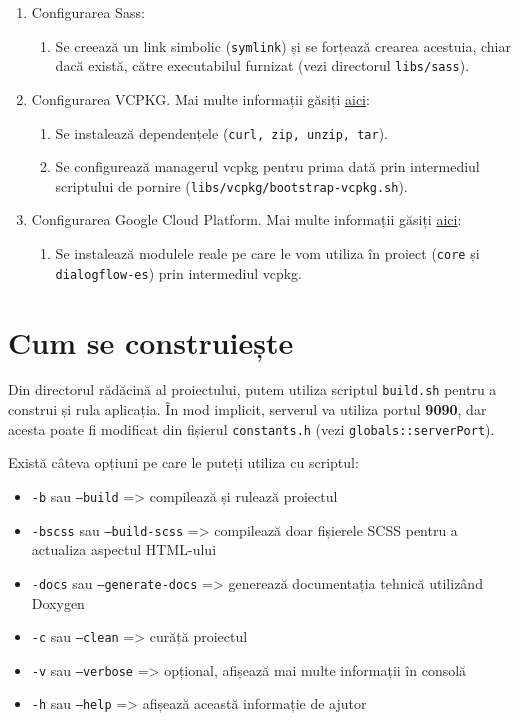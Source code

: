 \begin{enumerate}
  \item Configurarea Sass:
    \begin{enumerate}
      \item Se creează un link simbolic (\texttt{symlink}) și se forțează crearea acestuia, chiar dacă există, către executabilul furnizat (vezi directorul \texttt{libs/sass}).
    \end{enumerate}
  \item Configurarea VCPKG. Mai multe informații găsiți \href{https://github.com/Microsoft/vcpkg}{aici}:
    \begin{enumerate}
      \item Se instalează dependențele (\texttt{curl, zip, unzip, tar}).
      \item Se configurează managerul vcpkg pentru prima dată prin intermediul scriptului de pornire (\texttt{libs/vcpkg/bootstrap-vcpkg.sh}).
    \end{enumerate}
  \item Configurarea Google Cloud Platform. Mai multe informații găsiți \href{https://github.com/googleapis/google-cloud-cpp/tree/main/google/cloud/dialogflow_es/quickstart}{aici}:
    \begin{enumerate}
      \item Se instalează modulele reale pe care le vom utiliza în proiect (\texttt{core} și \texttt{dialogflow-es}) prin intermediul vcpkg.
    \end{enumerate}
\end{enumerate}

\section{Cum se construiește}
Din directorul rădăcină al proiectului, putem utiliza scriptul \texttt{build.sh} pentru a construi și rula aplicația. În mod implicit, serverul va utiliza portul \textbf{9090}, dar acesta poate fi modificat din fișierul \texttt{constants.h} (vezi \texttt{globals::serverPort}).

Există câteva opțiuni pe care le puteți utiliza cu scriptul:
\begin{itemize}
  \item \texttt{-b} sau \texttt{--build} => compilează și rulează proiectul
  \item \texttt{-bscss} sau \texttt{--build-scss} => compilează doar fișierele SCSS pentru a actualiza aspectul HTML-ului
  \item \texttt{-docs} sau \texttt{--generate-docs} => generează documentația tehnică utilizând Doxygen
  \item \texttt{-c} sau \texttt{--clean} => curăță proiectul
  \item \texttt{-v} sau \texttt{--verbose} => opțional, afișează mai multe informații în consolă
  \item \texttt{-h} sau \texttt{--help} => afișează această informație de ajutor
\end{itemize}

